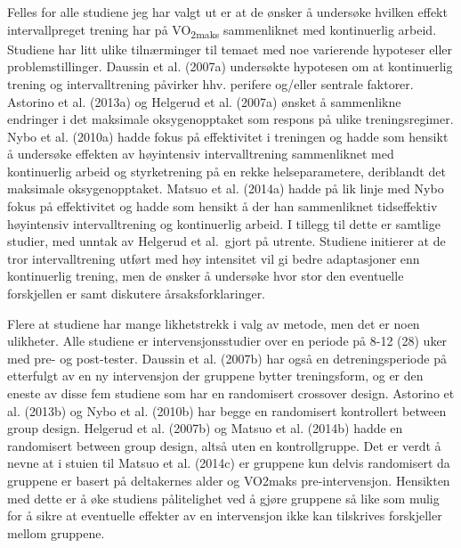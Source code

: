 \documentclass[
  letterpaper,
  DIV=11,
  numbers=noendperiod]{scrartcl}
\begin{document}
Felles for alle studiene jeg har valgt ut er at de ønsker å undersøke
hvilken effekt intervallpreget trening har på VO\textsubscript{2maks}
sammenliknet med kontinuerlig arbeid. Studiene har litt ulike
tilnærminger til temaet med noe varierende hypoteser eller
problemstillinger. Daussin et al. (2007a) undersøkte hypotesen om at
kontinuerlig trening og intervalltrening påvirker hhv. perifere og/eller
sentrale faktorer. Astorino et al. (2013a) og Helgerud et al. (2007a)
ønsket å sammenlikne endringer i det maksimale oksygenopptaket som
respons på ulike treningsregimer. Nybo et al. (2010a) hadde fokus på
effektivitet i treningen og hadde som hensikt å undersøke effekten av
høyintensiv intervalltrening sammenliknet med kontinuerlig arbeid og
styrketrening på en rekke helseparametere, deriblandt det maksimale
oksygenopptaket. Matsuo et al. (2014a) hadde på lik linje med Nybo fokus
på effektivitet og hadde som hensikt å der han sammenliknet tidseffektiv
høyintensiv intervalltrening og kontinuerlig arbeid. I tillegg til dette
er samtlige studier, med unntak av Helgerud et al.~gjort på utrente.
Studiene initierer at de tror intervalltrening utført med høy intensitet
vil gi bedre adaptasjoner enn kontinuerlig trening, men de ønsker å
undersøke hvor stor den eventuelle forskjellen er samt diskutere
årsaksforklaringer.

Flere at studiene har mange likhetstrekk i valg av metode, men det er
noen ulikheter. Alle studiene er intervensjonsstudier over en periode på
8-12 (28) uker med pre- og post-tester. Daussin et al. (2007b) har også
en detreningsperiode på etterfulgt av en ny intervensjon der gruppene
bytter treningsform, og er den eneste av disse fem studiene som har en
randomisert crossover design. Astorino et al. (2013b) og Nybo et al.
(2010b) har begge en randomisert kontrollert between group design.
Helgerud et al. (2007b) og Matsuo et al. (2014b) hadde en randomisert
between group design, altså uten en kontrollgruppe. Det er verdt å nevne
at i stuien til Matsuo et al. (2014c) er gruppene kun delvis randomisert
da gruppene er basert på deltakernes alder og VO2maks pre-intervensjon.
Hensikten med dette er å øke studiens pålitelighet ved å gjøre gruppene
så like som mulig for å sikre at eventuelle effekter av en intervensjon
ikke kan tilskrives forskjeller mellom gruppene.
\end{document}
